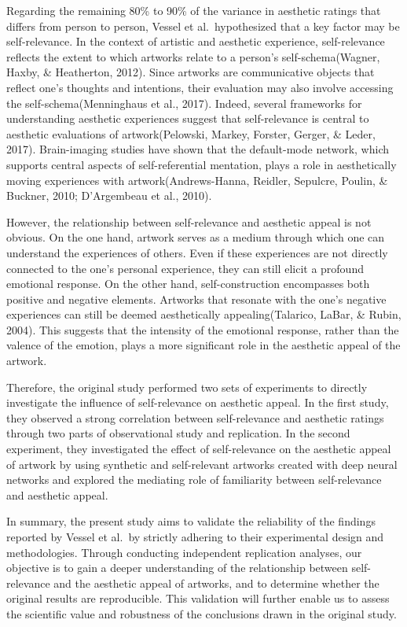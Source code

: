 \documentclass[
  man]{apa6}
\begin{document}
Regarding the remaining 80\% to 90\% of the variance in aesthetic ratings that differs from person to person, Vessel et al.~hypothesized that a key factor may be self-relevance. In the context of artistic and aesthetic experience, self-relevance reflects the extent to which artworks relate to a person's self-schema(Wagner, Haxby, \& Heatherton, 2012). Since artworks are communicative objects that reflect one's thoughts and intentions, their evaluation may also involve accessing the self-schema(Menninghaus et al., 2017). Indeed, several frameworks for understanding aesthetic experiences suggest that self-relevance is central to aesthetic evaluations of artwork(Pelowski, Markey, Forster, Gerger, \& Leder, 2017). Brain-imaging studies have shown that the default-mode network, which supports central aspects of self-referential mentation, plays a role in aesthetically moving experiences with artwork(Andrews-Hanna, Reidler, Sepulcre, Poulin, \& Buckner, 2010; D'Argembeau et al., 2010).

However, the relationship between self-relevance and aesthetic appeal is not obvious. On the one hand, artwork serves as a medium through which one can understand the experiences of others. Even if these experiences are not directly connected to the one's personal experience, they can still elicit a profound emotional response. On the other hand, self-construction encompasses both positive and negative elements. Artworks that resonate with the one's negative experiences can still be deemed aesthetically appealing(Talarico, LaBar, \& Rubin, 2004). This suggests that the intensity of the emotional response, rather than the valence of the emotion, plays a more significant role in the aesthetic appeal of the artwork.

Therefore, the original study performed two sets of experiments to directly investigate the influence of self-relevance on aesthetic appeal. In the first study, they observed a strong correlation between self-relevance and aesthetic ratings through two parts of observational study and replication. In the second experiment, they investigated the effect of self-relevance on the aesthetic appeal of artwork by using synthetic and self-relevant artworks created with deep neural networks and explored the mediating role of familiarity between self-relevance and aesthetic appeal.

In summary, the present study aims to validate the reliability of the findings reported by Vessel et al.~by strictly adhering to their experimental design and methodologies. Through conducting independent replication analyses, our objective is to gain a deeper understanding of the relationship between self-relevance and the aesthetic appeal of artworks, and to determine whether the original results are reproducible. This validation will further enable us to assess the scientific value and robustness of the conclusions drawn in the original study.
\end{document}
